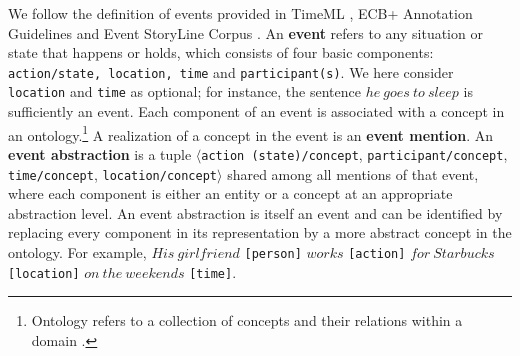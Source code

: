 \begin{table*}[bt!]
\centering
{}
\caption{Terminologies of the \texttt{ACCESS} benchmark.}\label{tab:term}
\end{table*}

We follow the definition of events provided in TimeML \cite{pustejovsky2003timebank}, ECB+ Annotation Guidelines \cite{cybulska2014guidelines} and Event StoryLine Corpus \cite{caselli2017event}. An \textbf{event} refers to any situation or state that happens or holds, which consists of four basic components: \texttt{action/state, location, time} and \texttt{participant(s)}. We here consider \texttt{location} and \texttt{time} as optional; for instance, the sentence $he \ goes \ to \ sleep$ is sufficiently an event. Each component of an event is associated with a concept in an ontology.\footnote{Ontology refers to a collection of concepts and their relations within a domain \cite{gruber1993translation}.} A realization of a concept in the event is an  \textbf{event mention}. An \textbf{event abstraction} is a tuple $\langle$\texttt{action (state)/concept}, \texttt{participant/concept}, \texttt{time/concept}, \texttt{location/concept}$\rangle$ shared among all mentions of that event, where each component is either an entity or a concept at an appropriate abstraction level. An event abstraction is itself an event and can be identified by replacing every component in its representation by a more abstract concept in the ontology. For example, 
$His \ girlfriend$ \texttt{[person]} $works$ \texttt{[action]} $for \ Starbucks$ \texttt{[location]} $on \ the \ weekends$ \texttt{[time]}. 


